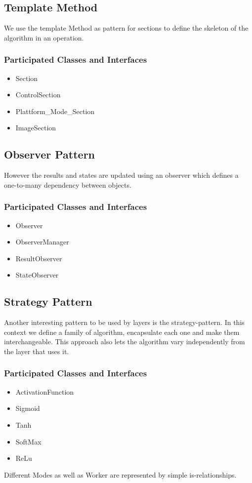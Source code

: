 \documentclass[parskip=full]{scrartcl}
\begin{document}
	\subsection{Template Method}
	We use the template Method as pattern for sections to define the skeleton of the algorithm in an operation.
		\subsubsection{Participated Classes and Interfaces}
		\begin{itemize}
			\item Section
			\item ControlSection
			\item Plattform\_Mode\_Section
			\item ImageSection
		\end{itemize}
	\subsection{Observer Pattern}
	However the results and states are updated using an observer which defines a one-to-many dependency between objects.
			\subsubsection{Participated Classes and Interfaces}
		\begin{itemize}
			\item Observer
			\item ObserverManager
			\item ResultObserver
			\item StateObserver
		\end{itemize}
	\subsection{Strategy Pattern}
	Another interesting pattern to be used by layers is the strategy-pattern. In this context we define a family of algorithm, 			encapsulate each one and make them interchangeable. This approach also lets the algorithm vary independently from the 			layer that uses it.
			\subsubsection{Participated Classes and Interfaces}
		\begin{itemize}
			\item ActivationFunction
			\item Sigmoid
			\item Tanh
			\item SoftMax
			\item ReLu
		\end{itemize}
Different Modes as well as Worker are represented by simple is-relationships.
\end{document}
